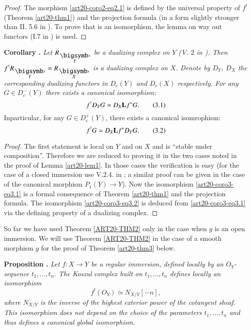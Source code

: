 \begin{proof}
The morphism \eqref{art20-coro2-eq2.1} is defined by the universal property of $f^{!}$ (Theorem \ref{art20-thm1}) and the projection formula (in a form slightly stronger than II. 5.6 in \cite{art20-key1}). To prove that is an isomorphism, the lemma on way out functors (I.7 in \cite{art20-key1}) is used.
\end{proof}

\medskip
\noindent
{\bf Corollary .\label{art20-coro3}}
{\em Let $R_{\overdot{Y}}$ be a dualizing complex on $Y$ (V. $2$ in \cite{art20-key1}). Then $f^{!}R_{\overdot{Y}}=R_{\overdot{X}}$ is a dualizing complex on $X$. Denote by $D_{Y}$, $D_{X}$ the corresponding dualizing functors in $D_{c}(Y)$ and $D_{c}(X)$ respectively. For any $G\in D^{-}_{c}(Y)$ there exists a canonical isomorphism:}
\begin{equation*}
f^{!}D_{Y}G\simeq D_{X}\mathbf{L} f^{*}G.\tag{3.1}\label{art20-coro3-eq3.1}
\end{equation*}
In\pageoriginale particular, for any $G\in D^{+}_{c}(Y)$, there exists a canonical isomrophism:
\begin{equation*}
f^{!}G\simeq D_{X}\mathbf{L} f^{*}D_{Y}G.\tag{3.2}\label{art20-coro3-eq3.2}
\end{equation*}

\begin{proof}
The first statement is local on $Y$ and on $X$ and is ``stable under composition''. Therefore we are reduced to proving it in the two cases noted in the proof of Lemma \ref{art20-lem1}. In those cases the verification is easy (for the case of a closed immersion use V.2.4. in \cite{art20-key1}; a similar proof can be given in the case of the canonical morphism $P_{1}(Y)\to Y$). Now the isomorphism \eqref{art20-coro3-eq3.1} is a formal consequence of Theorem \ref{art20-thm1} and the projection formula. The isomorphism \eqref{art20-coro3-eq3.2} is deduced from \eqref{art20-coro3-eq3.1} via the defining property of a dualizing complex.
\end{proof}

So far we have used Theorem \ref{ART20-THM2} only in the case when $g$ is an open immersion. We will use Theorem \ref{ART20-THM2} in the case of a smooth morphism $g$ for the proof of Theorem \ref{art20-thm3} below.

\medskip
\noindent
{\bf Proposition .\label{art20-sec2-prop1}}
{\em Let $f:X\to Y$ be a regular immersion, defined locally by an $O_{Y}$-sequence $t_{1},\ldots,t_{n}$. The Koszul complex built on $t_{1},\ldots,t_{n}$ defines locally an isomorphism}
$$
f^{!}(O_{Y})\simeq N_{X/Y}[-n],
$$
{\em where $N_{X/Y}$ is the inverse of the highest exterior power of the cotangent sheaf. This isomorphism does not depend on the choice of the parameters $t_{1},\ldots,t_{n}$ and thus defines a canonical global isomorphism.}
\smallskip

